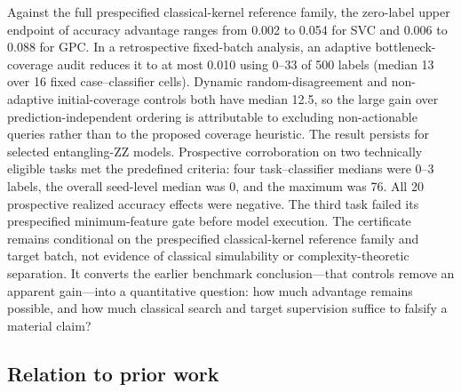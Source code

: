 \documentclass[referee,lineno,pdflatex,sn-vancouver-num]{sn-jnl}
\theoremstyle{thmstyleone}%
\theoremstyle{thmstyletwo}%
\theoremstyle{thmstylethree}%
\begin{document}
Against the full prespecified classical-kernel reference family, the zero-label upper endpoint of accuracy advantage ranges from 0.002 to 0.054 for SVC and 0.006 to 0.088 for GPC. In a retrospective fixed-batch analysis, an adaptive bottleneck-coverage audit reduces it to at most 0.010 using 0--33 of 500 labels (median 13 over 16 fixed case--classifier cells). Dynamic random-disagreement and non-adaptive initial-coverage controls both have median 12.5, so the large gain over prediction-independent ordering is attributable to excluding non-actionable queries rather than to the proposed coverage heuristic. The result persists for selected entangling-ZZ models. Prospective corroboration on two technically eligible tasks met the predefined criteria: four task--classifier medians were 0--3 labels, the overall seed-level median was 0, and the maximum was 76. All 20 prospective realized accuracy effects were negative. The third task failed its prespecified minimum-feature gate before model execution. The certificate remains conditional on the prespecified classical-kernel reference family and target batch, not evidence of classical simulability or complexity-theoretic separation. It converts the earlier benchmark conclusion---that controls remove an apparent gain---into a quantitative question: how much advantage remains possible, and how much classical search and target supervision suffice to falsify a material claim?

\subsection{Relation to prior work}
\label{sec:intro_prior}
\end{document}
